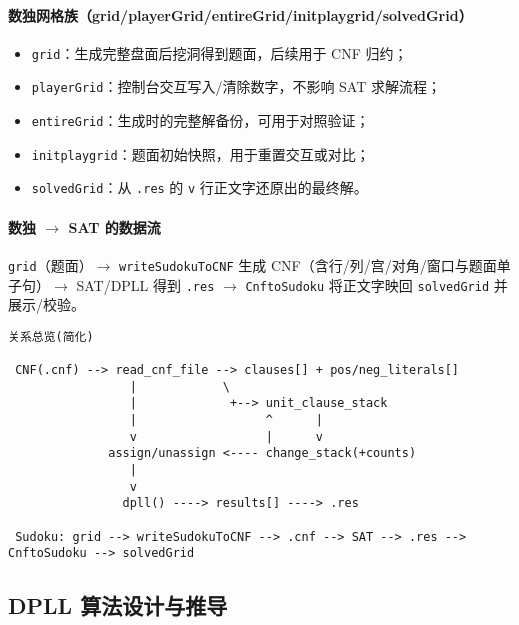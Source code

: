 \documentclass[UTF8]{ctexart}
\begin{document}
\paragraph{数独网格族（grid/playerGrid/entireGrid/initplaygrid/solvedGrid）}
\begin{itemize}
  \item \texttt{grid}：生成完整盘面后挖洞得到题面，后续用于 CNF 归约；
  \item \texttt{playerGrid}：控制台交互写入/清除数字，不影响 SAT 求解流程；
  \item \texttt{entireGrid}：生成时的完整解备份，可用于对照验证；
  \item \texttt{initplaygrid}：题面初始快照，用于重置交互或对比；
  \item \texttt{solvedGrid}：从 \texttt{.res} 的 \texttt{v} 行正文字还原出的最终解。
\end{itemize}

\paragraph{数独 \(\to\) SAT 的数据流} \texttt{grid}（题面）\(\to\) \texttt{writeSudokuToCNF} 生成 CNF（含行/列/宫/对角/窗口与题面单子句）\(\to\) SAT/DPLL 得到 \texttt{.res} \(\to\) \texttt{CnftoSudoku} 将正文字映回 \texttt{solvedGrid} 并展示/校验。

\begin{lstlisting}[language={}]
关系总览(简化)

 CNF(.cnf) --> read_cnf_file --> clauses[] + pos/neg_literals[]
                 |            \
                 |             +--> unit_clause_stack
                 |                  ^      |
                 v                  |      v
              assign/unassign <---- change_stack(+counts)
                 |
                 v
                dpll() ----> results[] ----> .res

 Sudoku: grid --> writeSudokuToCNF --> .cnf --> SAT --> .res --> CnftoSudoku --> solvedGrid
\end{lstlisting}

\subsection{DPLL 算法设计与推导}
\end{document}
